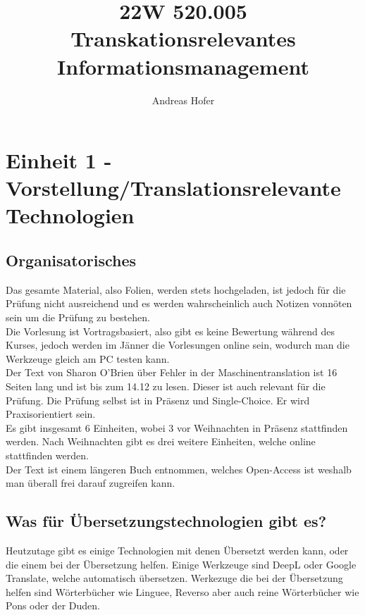 \documentclass{article}
\title{\vspace{-3cm}22W 520.005 Transkationsrelevantes Informationsmanagement}
\author{Andreas Hofer}
\begin{document}
	\section{Einheit 1 - Vorstellung/Translationsrelevante Technologien}
	\subsection{Organisatorisches}
	Das gesamte Material, also Folien, werden stets hochgeladen, ist jedoch für die Prüfung nicht ausreichend und es werden wahrscheinlich auch Notizen vonnöten sein um die Prüfung zu bestehen. \\
	Die Vorlesung ist Vortragsbasiert, also gibt es keine Bewertung während des Kurses, jedoch werden im Jänner die Vorlesungen online sein, wodurch man die Werkzeuge gleich am PC testen kann. \\
	Der Text von Sharon O'Brien über Fehler in der Maschinentranslation ist 16 Seiten lang und ist bis zum 14.12 zu lesen. Dieser ist auch relevant für die Prüfung. Die Prüfung selbst ist in Präsenz und Single-Choice. Er wird Praxisorientiert sein. \\
	Es gibt insgesamt 6 Einheiten, wobei 3 vor Weihnachten in Präsenz stattfinden werden. Nach Weihnachten gibt es drei weitere Einheiten, welche online stattfinden werden. \\
	Der Text ist einem längeren Buch entnommen, welches Open-Access ist weshalb man überall frei darauf zugreifen kann. \\
	\subsection{Was für Übersetzungstechnologien gibt es?}
	Heutzutage gibt es einige Technologien mit denen Übersetzt werden kann, oder die einem bei der Übersetzung helfen. Einige Werkzeuge sind DeepL oder Google Translate, welche automatisch übersetzen. Werkezuge die bei der Übersetzung helfen sind Wörterbücher wie Linguee, Reverso aber auch reine Wörterbücher wie Pons oder der Duden.
\end{document}
